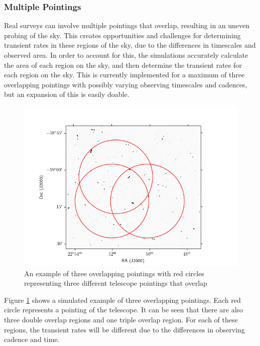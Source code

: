 \documentclass[12pt]{article}
\begin{document}
\subsubsection{Multiple Pointings}
Real surveys can involve multiple pointings that overlap, resulting in an uneven probing of the sky. This creates opportunities and challenges for determining transient rates in these regions of the sky, due to the differences in timescales and observed area. 
In order to account for this, the simulations accurately calculate the area of each region on the sky, and then determine the transient rates for each region on the sky. This is currently implemented for a maximum of three overlapping pointings with possibly varying observing timescales and cadences, but an expansion of this is easily doable. 

\begin{figure}
\includegraphics[width=\columnwidth]{Figure_1_blank.png}
\caption{An example of three overlapping pointings with red circles representing three different telescope pointings that overlap}
\label{threepointings}
 \end{figure}

Figure \ref{threepointings} shows a simulated example of three overlapping pointings. Each red circle represents a pointing of the telescope. It can be seen that there are also three double overlap regions and one triple overlap region. For each of these regions, the transient rates will be different due to the differences in observing cadence and time. 
\end{document}
